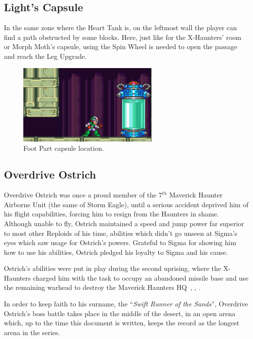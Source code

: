 \subsection{Light's Capsule}\label{X2:Foot_parts}
In the same zone where the Heart Tank is, on the leftmost wall the player can find a path obstructed by some blocks. Here, just like for the X-Haunters' room or Morph Moth's capsule, using the Spin Wheel is needed to open the passage and reach the Leg Upgrade.
\begin{figure}[htp]
	\centering
	\includegraphics[height=4cm]{figures/X2/Overdrive_ostrich/Ostrich_capsule.jpg}
	\caption{Foot Part capsule location.}
\end{figure}

\subsection{Overdrive Ostrich}\label{boss:Overdrive_ostrich}
Overdrive Ostrich was once a proud member of the 7$^{th}$ Maverick Haunter Airborne Unit (the same of Storm Eagle), until a serious accident deprived him of his flight capabilities, forcing him to resign from the Haunters in shame. Although unable to fly, Ostrich maintained a speed and jump power far superior to most other Reploids of his time, abilities which didn't go unseen at Sigma's eyes which saw usage for Ostrich's powers. Grateful to Sigma for showing him how to use his abilities, Ostrich pledged his loyalty to Sigma and his cause.

Ostrich's abilities were put in play during the second uprising, where the X-Haunters charged him with the task to occupy an abandoned missile base and use the remaining warhead to destroy the Maverick Haunters HQ~\cite{Xcoll1:Manual_X2}, \cite{wayback:X2_resources}, \cite{wiki:Overdrive_Ostrich}.

In order to keep faith to his surname, the ``\textit{Swift Runner of the Sands}'', Overdrive Ostrich's boss battle takes place in the middle of the desert, in an open arena which, up to the time this document is written, keeps the record as the longest arena in the series. 


